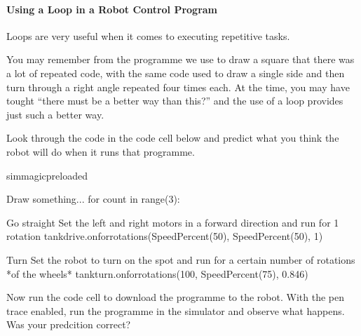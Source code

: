 \documentclass[letterpaper,10pt,english]{sphinxmanual}
\begin{document}
\paragraph{Using a  Loop in a Robot Control Program}
\label{\detokenize{content/02_Robot_Lab/Section_00_01:Using-a-for..in..-Loop-in-a-Robot-Control-Program}}
Loops are very useful when it comes to executing repetitive tasks.

You may remember from the programme we use to draw a square that there was a lot of repeated code, with the same code used to draw a single side and then turn through a right angle repeated four times each. At the time, you may have tought “there must be a better way than this?” and the use of a loop provides just such a better way.

Look through the code in the code cell below and predict what you think the robot will do when it runs that programme.


{
\begin{sphinxVerbatim}[commandchars=\\\{\}]
\llap{\color{nbsphinxin}[ ]:\,\hspace{\fboxrule}\hspace{\fboxsep}}\PYGZpc{}\PYGZpc{}sim\PYGZus{}magic\PYGZus{}preloaded

\PYGZsh{} Draw something...
for count in range(3):

    \PYGZsh{}Go straight
    \PYGZsh{} Set the left and right motors in a forward direction
    \PYGZsh{} and run for 1 rotation
    tank\PYGZus{}drive.on\PYGZus{}for\PYGZus{}rotations(SpeedPercent(50), SpeedPercent(50), 1)

    \PYGZsh{}Turn
    \PYGZsh{} Set the robot to turn on the spot
    \PYGZsh{} and run for a certain number of rotations *of the wheels*
    tank\PYGZus{}turn.on\PYGZus{}for\PYGZus{}rotations(\PYGZhy{}100, SpeedPercent(75), 0.846)

\end{sphinxVerbatim}
}

Now run the code cell to download the programme to the robot. With the pen trace enabled, run the programme in the simulator and observe what happens. Was your predcition correct?
\end{document}
